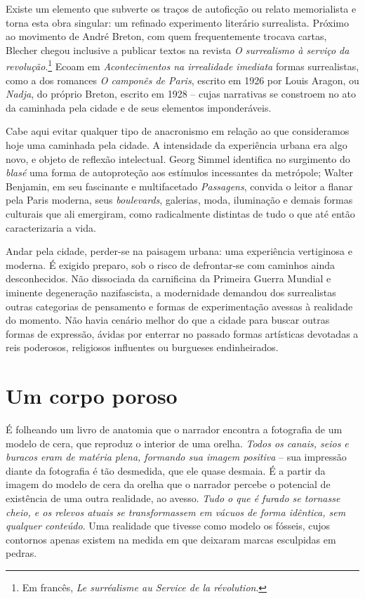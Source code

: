 Existe um elemento que subverte os traços de autoficção ou relato memorialista e torna esta obra singular: um refinado experimento literário surrealista. Próximo ao movimento de André Breton, com quem frequentemente trocava cartas, Blecher chegou inclusive a publicar textos na revista \textit{O surrealismo à serviço da revolução}.\footnote{Em francês, \textit{Le surréalisme au Service de la révolution}.} Ecoam em \textit{Acontecimentos na irrealidade imediata} formas surrealistas, como a dos romances \textit{O camponês de Paris}, escrito em 1926 por Louis Aragon, ou \textit{Nadja}, do próprio Breton, escrito em 1928 -- cujas narrativas se constroem no ato da caminhada pela cidade e de seus elementos imponderáveis.

Cabe aqui evitar qualquer tipo de anacronismo em relação ao que consideramos hoje uma caminhada pela cidade. A intensidade da experiência urbana era algo novo, e objeto de reflexão intelectual. Georg Simmel identifica no surgimento do \textit{blasé} uma forma de autoproteção aos estímulos incessantes da metrópole; Walter Benjamin, em seu fascinante e multifacetado \textit{Passagens}, convida o leitor a flanar pela Paris moderna, seus \textit{boulevards}, galerias, moda, iluminação e demais formas culturais que ali emergiram, como radicalmente distintas de tudo o que até então caracterizaria a vida.

Andar pela cidade, perder-se na paisagem urbana: uma experiência vertiginosa e moderna. É exigido preparo, sob o risco de defrontar-se com caminhos ainda desconhecidos. Não dissociada da carnificina da Primeira Guerra Mundial e iminente degeneração nazifascista, a modernidade demandou dos surrealistas outras categorias de pensamento e formas de experimentação avessas à realidade do momento. Não havia cenário melhor do que a cidade para buscar outras formas de expressão, ávidas por enterrar no passado formas artísticas devotadas a reis poderosos, religiosos influentes ou burgueses endinheirados.

\section{Um corpo poroso}

É folheando um livro de anatomia que o narrador encontra a fotografia de um modelo de cera, que reproduz o interior de uma orelha. \textit{Todos os canais, seios e buracos eram de matéria plena, formando sua imagem positiva} -- sua impressão diante da fotografia é tão desmedida, que ele quase desmaia. É a partir da imagem do modelo de cera da orelha que o narrador percebe o potencial de existência de uma outra realidade, ao avesso. \textit{Tudo o que é furado se tornasse cheio, e os relevos atuais se transformassem em vácuos de forma idêntica, sem qualquer conteúdo}. Uma realidade que tivesse como modelo os fósseis, cujos contornos apenas existem na medida em que deixaram marcas esculpidas em pedras.

